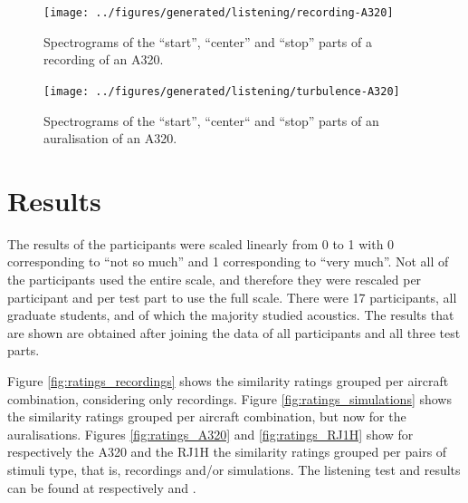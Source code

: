 \begin{figure}[H]
  \centering
  \texttt{[image: ../figures/generated/listening/recording-A320]}
  \caption{Spectrograms of the ``start'', ``center'' and ``stop'' parts of a recording of an A320.}
  \label{fig:listening:recording-A320}
\end{figure}

\begin{figure}[H]
  \centering
  \texttt{[image: ../figures/generated/listening/turbulence-A320]}
  \caption{Spectrograms of the ``start'', ``center`` and ``stop'' parts of an auralisation of an A320.}
  \label{fig:listening:simulation-A320}
\end{figure}

\newpage
\section{Results}
The results of the participants were scaled linearly from 0 to 1 with 0
corresponding to ``not so much'' and 1 corresponding to ``very much''. Not all
of the participants used the entire scale, and therefore they were rescaled per
participant and per test part to use the full scale. There were 17 participants,
all graduate students, and of which the majority studied acoustics. The results
that are shown are obtained after joining the data of all participants and all
three test parts.


Figure \ref{fig:ratings_recordings} shows the similarity ratings grouped per
aircraft combination, considering only recordings. Figure
\ref{fig:ratings_simulations} shows the similarity ratings grouped per aircraft
combination, but now for the auralisations. Figures \ref{fig:ratings_A320} and
\ref{fig:ratings_RJ1H} show for respectively the A320 and the RJ1H the
similarity ratings grouped per pairs of stimuli type, that is, recordings and/or
simulations. The listening test and results can be found at respectively
\cite{Rietdijk2017a} and \cite{Rietdijk2017b}.


